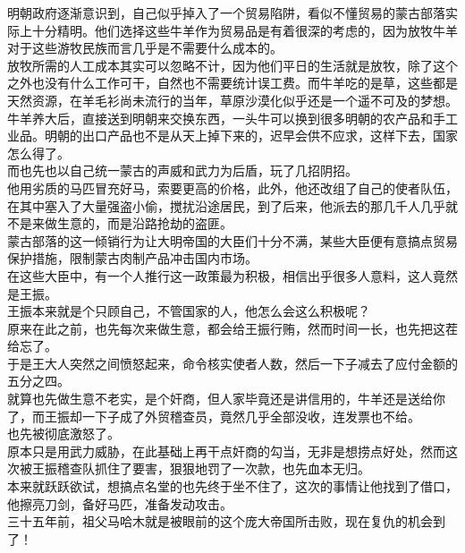 \begin{multicols}{\theparacolNo}
明朝政府逐渐意识到，自己似乎掉入了一个贸易陷阱，看似不懂贸易的蒙古部落实际上十分精明。他们选择这些牛羊作为贸易品是有着很深的考虑的，因为放牧牛羊对于这些游牧民族而言几乎是不需要什么成本的。\\

放牧所需的人工成本其实可以忽略不计，因为他们平日的生活就是放牧，除了这个之外也没有什么工作可干，自然也不需要统计误工费。而牛羊吃的是草，这些都是天然资源，在羊毛衫尚未流行的当年，草原沙漠化似乎还是一个遥不可及的梦想。\\

牛羊养大后，直接送到明朝来交换东西，一头牛可以换到很多明朝的农产品和手工业品。明朝的出口产品也不是从天上掉下来的，迟早会供不应求，这样下去，国家怎么得了。\\

而也先也以自己统一蒙古的声威和武力为后盾，玩了几招阴招。\\

他用劣质的马匹冒充好马，索要更高的价格，此外，他还改组了自己的使者队伍，在其中塞入了大量强盗小偷，搅扰沿途居民，到了后来，他派去的那几千人几乎就不是来做生意的，而是沿路抢劫的盗匪。\\

蒙古部落的这一倾销行为让大明帝国的大臣们十分不满，某些大臣便有意搞点贸易保护措施，限制蒙古肉制产品冲击国内市场。\\

在这些大臣中，有一个人推行这一政策最为积极，相信出乎很多人意料，这人竟然是王振。\\

王振本来就是个只顾自己，不管国家的人，他怎么会这么积极呢？\\

原来在此之前，也先每次来做生意，都会给王振行贿，然而时间一长，也先把这茬给忘了。\\

于是王大人突然之间愤怒起来，命令核实使者人数，然后一下子减去了应付金额的五分之四。\\

就算也先做生意不老实，是个奸商，但人家毕竟还是讲信用的，牛羊还是送给你了，而王振却一下子成了外贸稽查员，竟然几乎全部没收，连发票也不给。\\

也先被彻底激怒了。\\

原本只是用武力威胁，在此基础上再干点奸商的勾当，无非是想捞点好处，然而这次被王振稽查队抓住了要害，狠狠地罚了一次款，也先血本无归。\\

本来就跃跃欲试，想搞点名堂的也先终于坐不住了，这次的事情让他找到了借口，他擦亮刀剑，备好马匹，准备发动攻击。\\

三十五年前，祖父马哈木就是被眼前的这个庞大帝国所击败，现在复仇的机会到了！\\
\ifnum{}
	\end{multicols}
\fi
\newpage
